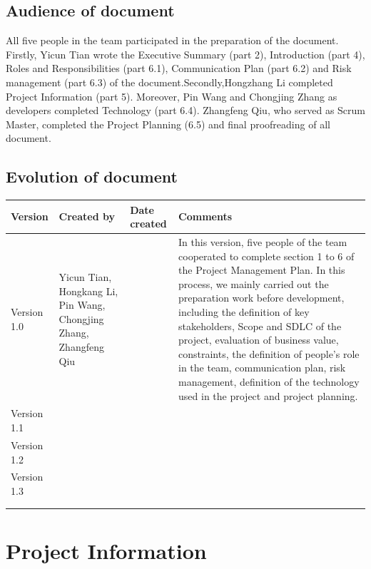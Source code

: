 \documentclass{report}
\begin{document}
\section{Audience of document}
   All five people in the team participated in the preparation of the document. Firstly, Yicun Tian wrote the Executive Summary (part 2), Introduction (part 4), Roles and Responsibilities (part 6.1), Communication Plan (part 6.2) and Risk management (part 6.3) of the document.Secondly,Hongzhang Li completed Project Information (part 5). Moreover, Pin Wang and Chongjing Zhang as developers completed Technology (part 6.4). Zhangfeng Qiu, who served as Scrum Master, completed the Project Planning (6.5) and final proofreading of all document.

\section{Evolution of document}
\begin{tabularx}{0.95\linewidth}{%
  l%
  >{\raggedright\arraybackslash}p{2.2cm}%
  >{\raggedright\arraybackslash}p{1.5cm}%
  >{\raggedright\arraybackslash}X}
  \toprule
  Version & Created by & Date created & Comments\\
  \midrule
  Version 1.0
  & Yicun Tian, Hongkang Li, Pin Wang, Chongjing Zhang, Zhangfeng Qiu
  & 4.27
  & In this version, five people of the team cooperated to complete section 1 to 6 of the Project Management Plan. In this process, we mainly carried out the preparation work before development, including the definition of key stakeholders, Scope and SDLC of the project, evaluation of business value, constraints, the definition of people's role in the team, communication plan, risk management, definition of the technology used in the project and project planning.
  \\
  \hline
  Version 1.1
  & 5.23
  & 
  & 
  \\
  \midrule
  Version 1.2
  & 5.30
  & 
  &
  \\
  \midrule
  Version 1.3
  & 6.5
  & 
  & 
  \\
  \bottomrule
  \\
  \caption{Evolution of document}  
  \label{tab:evolutionOfDocument}
\end{tabularx}

\chapter{Project Information}
\end{document}
